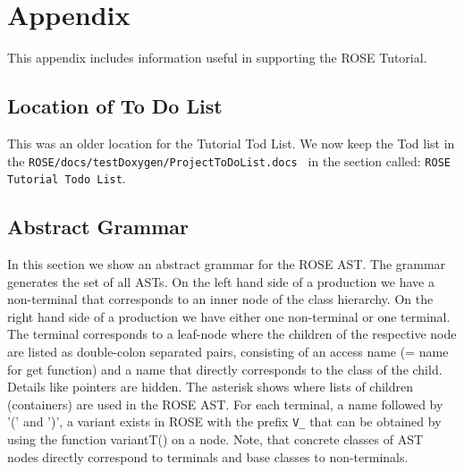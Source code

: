 \chapter{Appendix}

   This appendix includes information useful in supporting 
the ROSE Tutorial.

\section{Location of To Do List}

   This was an older location for the Tutorial Tod List.
We now keep the Tod list in the 
{\tt ROSE/docs/testDoxygen/ProjectToDoList.docs } in the section
called: {\tt ROSE Tutorial Todo List}.


\section{Abstract Grammar}

In this section we show an abstract grammar for the ROSE AST. The grammar
generates the set of all ASTs. On the left hand side of a production
we have a non-terminal that corresponds to an inner node of the class
hierarchy. On the right hand side of a production we have either one
non-terminal or one terminal. The terminal corresponds to a leaf-node
where the children of the respective node are listed as double-colon
separated pairs, consisting of an access name (= name for get
function) and a name that directly corresponds to the class of the
child. Details like pointers are hidden. The asterisk shows where
lists of children (containers) are used in the ROSE AST. For each terminal, a name followed by '(' and ')', a variant exists in ROSE with the prefix \verb+V_+ that can be obtained by using the function variantT() on a node. Note, that concrete classes of AST nodes directly correspond to terminals and base classes to non-terminals.

